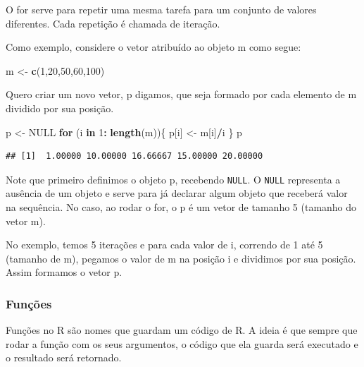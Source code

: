 \documentclass[
]{book}
\newenvironment{Shaded}{\begin{snugshade}}{\end{snugshade}}
\newcommand{\ControlFlowTok}[1]{\textcolor[rgb]{0.13,0.29,0.53}{\textbf{#1}}}
\newcommand{\DecValTok}[1]{\textcolor[rgb]{0.00,0.00,0.81}{#1}}
\newcommand{\KeywordTok}[1]{\textcolor[rgb]{0.13,0.29,0.53}{\textbf{#1}}}
\newcommand{\NormalTok}[1]{#1}
\newcommand{\OperatorTok}[1]{\textcolor[rgb]{0.81,0.36,0.00}{\textbf{#1}}}
\newcommand{\OtherTok}[1]{\textcolor[rgb]{0.56,0.35,0.01}{#1}}
\newcommand{\StringTok}[1]{\textcolor[rgb]{0.31,0.60,0.02}{#1}}
\begin{document}
O for serve para repetir uma mesma tarefa para um conjunto de valores diferentes. Cada repetição é chamada de iteração.

Como exemplo, considere o vetor atribuído ao objeto m como segue:

\begin{Shaded}
\begin{Highlighting}[]
\NormalTok{m <-}\StringTok{ }\KeywordTok{c}\NormalTok{(}\DecValTok{1}\NormalTok{,}\DecValTok{20}\NormalTok{,}\DecValTok{50}\NormalTok{,}\DecValTok{60}\NormalTok{,}\DecValTok{100}\NormalTok{)}
\end{Highlighting}
\end{Shaded}

Quero criar um novo vetor, p digamos, que seja formado por cada elemento
de m dividido por sua posição.

\begin{Shaded}
\begin{Highlighting}[]
\NormalTok{p <-}\StringTok{ }\OtherTok{NULL}
\ControlFlowTok{for}\NormalTok{ (i }\ControlFlowTok{in} \DecValTok{1}\OperatorTok{:}\StringTok{ }\KeywordTok{length}\NormalTok{(m))\{}
\NormalTok{  p[i] <-}\StringTok{ }\NormalTok{m[i]}\OperatorTok{/}\NormalTok{i}
\NormalTok{\}}
\NormalTok{p}
\end{Highlighting}
\end{Shaded}

\begin{verbatim}
## [1]  1.00000 10.00000 16.66667 15.00000 20.00000
\end{verbatim}

Note que primeiro definimos o objeto p, recebendo \texttt{NULL}. O \texttt{NULL} representa a ausência de um objeto e serve para já declarar algum objeto que receberá valor na sequência. No caso, ao rodar o for, o p é um vetor de tamanho 5 (tamanho do vetor m).

No exemplo, temos 5 iterações e para cada valor de i, correndo de 1 até 5 (tamanho de m), pegamos o valor de m na posição i e dividimos por sua posição. Assim formamos o vetor p.~

\hypertarget{funuxe7uxf5es}{%
\subsubsection{Funções}\label{funuxe7uxf5es}}

Funções no R são nomes que guardam um código de R. A ideia é que sempre que rodar a função com os seus argumentos, o código que ela guarda será executado e o resultado será retornado.
\end{document}
